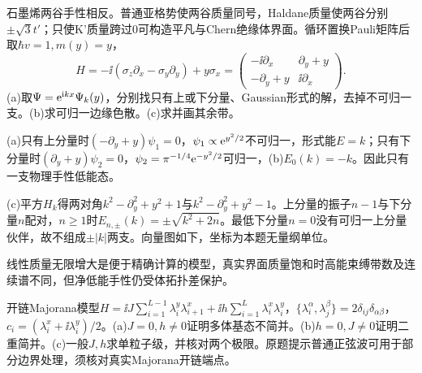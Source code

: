 \begin{exercise}[原题1(a)--(c)]
石墨烯两谷手性相反。普通亚格势使两谷质量同号，Haldane质量使两谷分别$\pm\sqrt3t'$；只使K'质量跨过0可构造平凡与Chern绝缘体界面。循环置换Pauli矩阵后取$\hbar v=1,m(y)=y$，
\begin{equation}
H=-\ii(\sigma_z\partial_x-\sigma_y\partial_y)+y\sigma_x=\begin{pmatrix}-\ii\partial_x&\partial_y+y\\-\partial_y+y&\ii\partial_x\end{pmatrix}.
\end{equation}
(a)取$\Psi=\mathrm e^{\mathrm i kx}\Psi_k(y)$，分别找只有上或下分量、Gaussian形式的解，去掉不可归一支。(b)求可归一边缘色散。(c)求并画其余带。
\end{exercise}
\begin{solution}
(a)只有上分量时$(-\partial_y+y)\psi_1=0$，$\psi_1\propto\mathrm e^{y^2/2}$不可归一，形式能$E=k$；只有下分量时$(\partial_y+y)\psi_2=0$，$\psi_2=\pi^{-1/4}\mathrm e^{-y^2/2}$可归一，(b)$E_0(k)=-k$。因此只有一支物理手性低能态。

(c)平方$H_k$得两对角$k^2-\partial_y^2+y^2+1$与$k^2-\partial_y^2+y^2-1$。上分量的振子$n-1$与下分量$n$配对，$n\ge1$时$E_{n,\pm}(k)=\pm\sqrt{k^2+2n}$。最低下分量$n=0$没有可归一上分量伙伴，故不组成$\pm|k|$两支。向量图如下，坐标为本题无量纲单位。
\begin{center}\end{center}
线性质量无限增大是便于精确计算的模型，真实界面质量饱和时高能束缚带数及连续谱不同，但净低能手性仍受体拓扑差保护。
\end{solution}
\begin{exercise}[原题1(a)--(c)]
开链Majorana模型$H=\ii J\sum_{i=1}^{L-1}\lambda_i^y\lambda_{i+1}^x+\ii h\sum_{i=1}^L\lambda_i^x\lambda_i^y$，$\{\lambda_i^\alpha,\lambda_j^\beta\}=2\delta_{ij}\delta_{\alpha\beta}$，$c_i=(\lambda_i^x+\ii\lambda_i^y)/2$。(a)$J=0,h\ne0$证明多体基态不简并。(b)$h=0,J\ne0$证明二重简并。(c)一般$J,h$求单粒子级，并核对两个极限。原题提示普通正弦波可用于部分边界处理，须核对真实Majorana开链端点。
\end{exercise}
